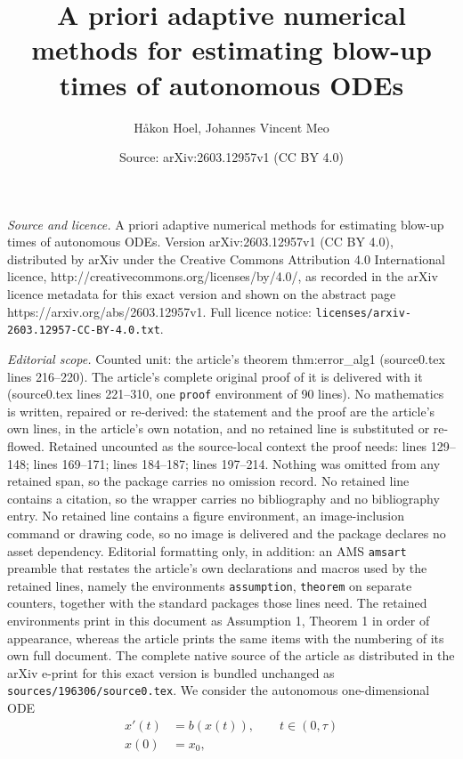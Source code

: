 \documentclass[10pt,a4paper]{amsart}
\title{A priori adaptive numerical methods for estimating blow-up times of autonomous ODEs}
\author{H{\aa}kon Hoel, Johannes Vincent Meo}
\date{Source: arXiv:2603.12957v1 (CC BY 4.0)}
\begin{document}
\maketitle

\noindent\emph{Source and licence.} A priori adaptive numerical methods for estimating blow-up times of autonomous ODEs. Version arXiv:2603.12957v1 (CC BY 4.0), distributed by arXiv under the Creative Commons Attribution 4.0 International licence, http://creativecommons.org/licenses/by/4.0/, as recorded in the arXiv licence metadata for this exact version and shown on the abstract page https://arxiv.org/abs/2603.12957v1. Full licence notice: \texttt{licenses/arxiv-2603.12957-CC-BY-4.0.txt}.\par\smallskip

\noindent\textit{Editorial scope.} Counted unit: the article's theorem thm:error\_alg1 (source0.tex lines 216--220). The article's complete original proof of it is delivered with it (source0.tex lines 221--310, one \texttt{proof} environment of 90 lines). No mathematics is written, repaired or re-derived: the statement and the proof are the article's own lines, in the article's own notation, and no retained line is substituted or re-flowed.  Retained uncounted as the source-local context the proof needs: lines 129--148; lines 169--171; lines 184--187; lines 197--214.  Nothing was omitted from any retained span, so the package carries no omission record.  No retained line contains a citation, so the wrapper carries no bibliography and no bibliography entry.  No retained line contains a figure environment, an image-inclusion command or drawing code, so no image is delivered and the package declares no asset dependency.  Editorial formatting only, in addition: an AMS \texttt{amsart} preamble that restates the article's own declarations and macros used by the retained lines, namely the environments \texttt{assumption}, \texttt{theorem} on separate counters, together with the standard packages those lines need.  The retained environments print in this document as Assumption 1, Theorem 1 in order of appearance, whereas the article prints the same items with the numbering of its own full document.  The complete native source of the article as distributed in the arXiv e-print for this exact version is bundled unchanged as \texttt{sources/196306/source0.tex}.
We consider the autonomous one-dimensional ODE
\begin{equation}
\label{eq:ode}
\begin{split}
    x'(t) &= b(x(t)), \qquad t \in (0, \tau)\\
    x(0) &= x_0,
\end{split}
\end{equation}
\end{document}
